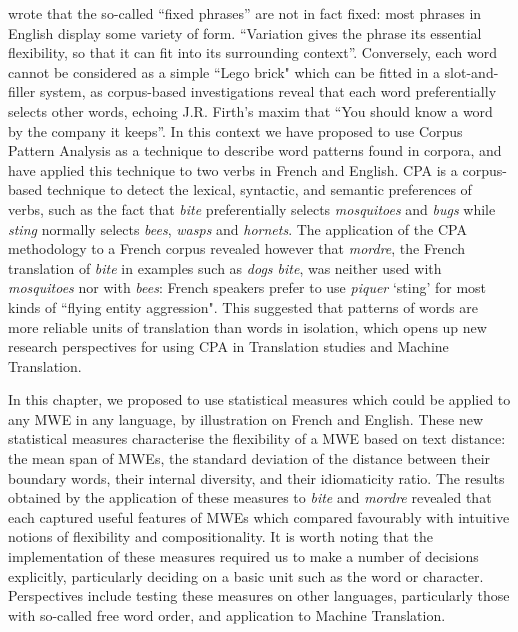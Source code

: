 \documentclass[output=paper]{langsci/langscibook}
\begin{document}
\citet{sinclair2004} wrote that the so-called “fixed phrases” are not in fact
fixed: most phrases in English display some variety of form. “Variation
gives the phrase its essential flexibility, so that it can fit into its
surrounding context”. Conversely, each word cannot be considered as a
simple ``Lego brick" which can be fitted in a slot-and-filler system, as
corpus-based investigations reveal that each word preferentially
selects other words, echoing J.R. Firth's maxim that “You should know a
word by the company it keeps”. In this context we have proposed to use
Corpus Pattern Analysis as a technique to describe word patterns found
in corpora, and have applied this technique to two verbs in French and
English. CPA is a corpus-based technique to detect the lexical,
syntactic, and semantic preferences of verbs, such as the fact that
\textit{bite} preferentially selects \textit{mosquitoes} and \textit{bugs} while \textit{sting}
normally selects \textit{bees}, \textit{wasps} and \textit{hornets}. The application of the
CPA methodology to a French corpus revealed however that \textit{mordre}, the
French translation of \textit{bite} in examples such as \textit{dogs bite}, was
neither used with \textit{mosquitoes} nor with \textit{bees}: French speakers prefer
to use \textit{piquer} ‘sting’ for most kinds of ``flying entity aggression".
This suggested that patterns of words are more reliable units of
translation than words in isolation, which opens up new research
perspectives for using CPA in Translation studies and Machine
Translation.



In this chapter, we proposed to use statistical measures which could be
applied to any MWE in any language, by illustration on French and
English. These new statistical measures characterise the flexibility of
a MWE based on text distance: the mean span of MWEs, the standard
deviation of the distance between their boundary words, their internal
diversity, and their idiomaticity ratio. The results obtained by the
application of these measures to \textit{bite} and \textit{mordre} revealed that each
captured useful features of MWEs which compared favourably with
intuitive notions of flexibility and compositionality. It is worth
noting that the implementation of these measures required us to make a number of decisions explicitly, particularly deciding on a
basic unit such as the word or character. Perspectives include testing
these measures on other languages, particularly those with so-called
free word order, and application to Machine Translation.
\end{document}
